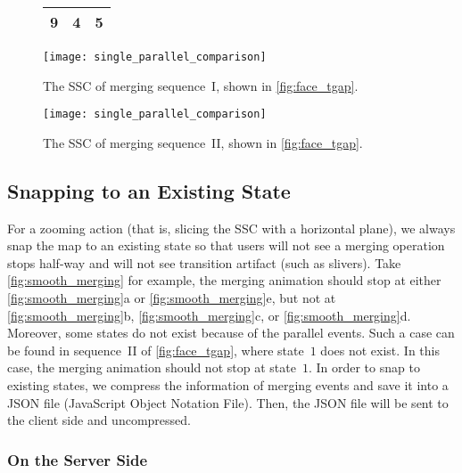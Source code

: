 \documentclass[ijgi,article,submit,moreauthors,pdftex]{Definitions/mdpi}
\begin{document}
\begin{figure}[tb]
{\begin{tabular}{ccc}
9       &     4         &     5          \\ \hline
\end{tabular}
}
\vspace{6mm} %
%
\captionsetup*{type=figure} %
\parbox{.49\linewidth}{
\centering
\texttt{[image: single\_parallel\_comparison]}
\vspace{3mm} %
\caption{The SSC of merging sequence~I, 
    shown in \fig\ref{fig:face_tgap}.}
\label{fig:ssc_single}
}
\parbox{.49\linewidth}{
\centering
\texttt{[image: single\_parallel\_comparison]}
\vspace{3mm} %
\caption{The SSC of merging sequence~II, 
    shown in \fig\ref{fig:face_tgap}.}
\label{fig:ssc_parallel}
}
\end{figure}




\subsection{Snapping to an Existing State}
\label{sec:snap}

For a zooming action
(that is, slicing the SSC with a horizontal plane), 
we always snap the map to an existing state
so that users will not see a merging operation stops half-way
and will not see transition artifact (such as slivers).
Take \fig\ref{fig:smooth_merging} for example, 
the merging animation should stop at 
either \ref{fig:smooth_merging}a or \ref{fig:smooth_merging}e,
but not at \ref{fig:smooth_merging}b, \ref{fig:smooth_merging}c, 
or \ref{fig:smooth_merging}d.
Moreover, some states do not exist because of the parallel events.
Such a case can be found in sequence~II of \fig\ref{fig:face_tgap},
where state~$1$ does not exist.
In this case, the merging animation should not stop at state~$1$.
In order to snap to existing states, 
we compress the information of merging events and save it into 
a JSON file (JavaScript Object Notation File).
Then, the JSON file will be sent to the client side and uncompressed.


\subsubsection{On the Server Side}
\label{sec:snap_server}
\end{document}
